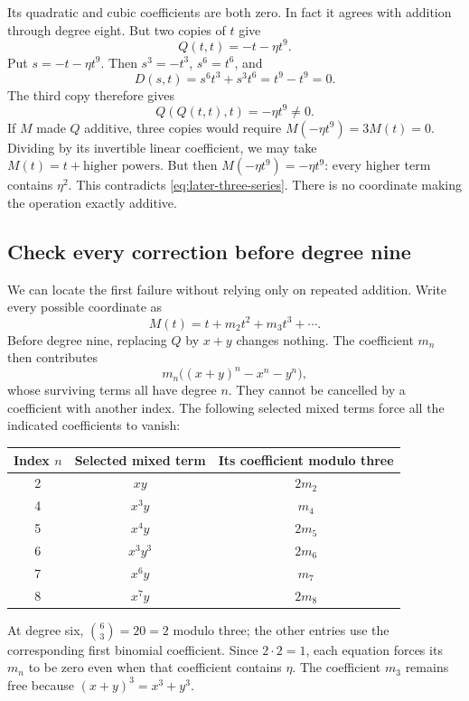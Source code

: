 \documentclass[11pt,letterpaper]{article}
\numberwithin{equation}{section}
\theoremstyle{definition}\newtheorem{example}[theorem]{Example}
\begin{document}
Its quadratic and cubic coefficients are both zero. In fact it agrees with addition through degree eight. But two copies of \(t\) give
\[
 Q(t,t)=-t-\eta t^9.
\]
Put \(s=-t-\eta t^9\). Then \(s^3=-t^3\), \(s^6=t^6\), and
\[
 D(s,t)=s^6t^3+s^3t^6=t^9-t^9=0.
\]
The third copy therefore gives
\begin{equation}\label{eq:later-three-series}
 \boxed{\;Q(Q(t,t),t)=-\eta t^9\ne0.\;}
\end{equation}
If \(M\) made \(Q\) additive, three copies would require \(M(-\eta t^9)=3M(t)=0\). Dividing by its invertible linear coefficient, we may take \(M(t)=t+\text{higher powers}\). But then \(M(-\eta t^9)=-\eta t^9\): every higher term contains \(\eta^2\). This contradicts \eqref{eq:later-three-series}. There is no coordinate making the operation exactly additive.

\subsection{Check every correction before degree nine}

We can locate the first failure without relying only on repeated addition. Write every possible coordinate as
\[
 M(t)=t+m_2t^2+m_3t^3+\cdots.
\]
Before degree nine, replacing \(Q\) by \(x+y\) changes nothing. The coefficient \(m_n\) then contributes
\[
 m_n\bigl((x+y)^n-x^n-y^n\bigr),
\]
whose surviving terms all have degree \(n\). They cannot be cancelled by a coefficient with another index. The following selected mixed terms force all the indicated coefficients to vanish:

\begin{center}
\begin{tabular}{ccc}
\toprule
Index \(n\)&Selected mixed term&Its coefficient modulo three\\
\midrule
2&\(xy\)&\(2m_2\)\\
4&\(x^3y\)&\(m_4\)\\
5&\(x^4y\)&\(2m_5\)\\
6&\(x^3y^3\)&\(2m_6\)\\
7&\(x^6y\)&\(m_7\)\\
8&\(x^7y\)&\(2m_8\)\\
\bottomrule
\end{tabular}
\end{center}
At degree six, \(\binom63=20=2\) modulo three; the other entries use the corresponding first binomial coefficient. Since \(2\cdot2=1\), each equation forces its \(m_n\) to be zero even when that coefficient contains \(\eta\). The coefficient \(m_3\) remains free because \((x+y)^3=x^3+y^3\).
\end{document}
